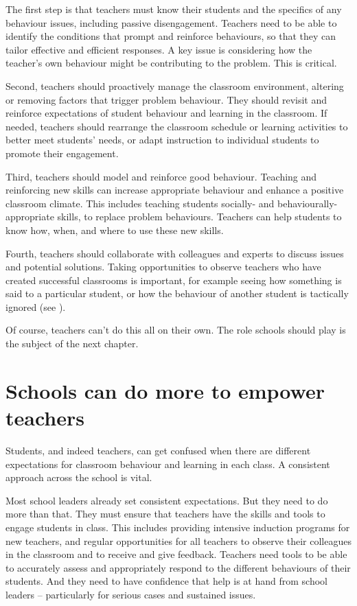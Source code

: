 \documentclass[FrontPage]{grattan}
\begin{document}
The first step is that teachers must know their students and the specifics of any behaviour issues, including passive disengagement. Teachers need to be able to identify the conditions that prompt and reinforce behaviours, so that they can tailor effective and efficient responses. A key issue is considering how the teacher's own behaviour might be contributing to the problem. This is critical. 
 
Second, teachers should proactively manage the classroom environment, altering or removing factors that trigger problem behaviour. They should revisit and reinforce expectations of student behaviour and learning in the classroom. If needed, teachers should rearrange the classroom schedule or learning activities to better meet students’ needs, or adapt instruction to individual students to promote their engagement.
 
Third, teachers should model and reinforce good behaviour. Teaching and reinforcing new skills can increase appropriate behaviour and enhance a positive classroom climate. This includes teaching students socially- and behaviourally-appropriate skills, to replace problem behaviours. Teachers can help students to know how, when, and where to use these new skills.

Fourth, teachers should collaborate with colleagues and experts to discuss issues and potential solutions. Taking opportunities to observe teachers who have created successful classrooms is important, for example seeing how something is said to a particular student, or how the behaviour of another student is tactically ignored (see ).
 
Of course, teachers can’t do this all on their own. The role schools should play is the subject of the next chapter.






\chapter{Schools can do more to empower teachers}\label{chap:schools-can-do-more}
Students, and indeed teachers, can get confused when there are different expectations for classroom behaviour and learning in each class. A consistent approach across the school is vital. 

Most school leaders already set consistent expectations. But they need to do more than that. They must ensure that teachers have the skills and tools to engage students in class. This includes providing intensive induction programs for new teachers, and regular opportunities for all teachers to observe their colleagues in the classroom and to receive and give feedback. Teachers need tools to be able to accurately assess and appropriately respond to the different behaviours of their students. And they need to have confidence that help is at hand from school leaders -- particularly for serious cases and sustained issues. 
\end{document}
